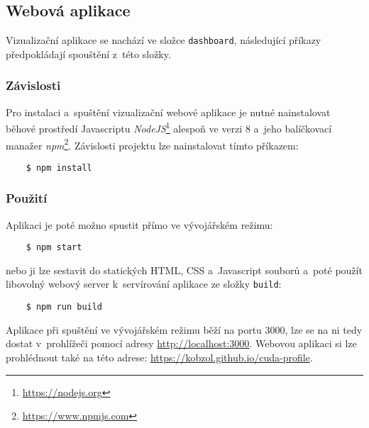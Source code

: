 \subsection{Webová aplikace}
Vizualizační aplikace se nachází ve složce \texttt{dashboard}, následující příkazy předpokládají spouštění z~této složky.

\subsubsection{Závislosti}
Pro instalaci a~spuštění vizualizační webové aplikace je nutné nainstalovat běhové prostředí Javascriptu \emph{NodeJS}\footnote{\url{https://nodejs.org}} alespoň ve verzi 8 a~jeho balíčkovací manažer \emph{npm}\footnote{\url{https://www.npmjs.com}}. Závislosti projektu lze nainstalovat tímto příkazem:
\begin{verbatim}
    $ npm install
\end{verbatim}

\subsubsection{Použití}
Aplikaci je poté možno spustit přímo ve vývojářském režimu:
\begin{verbatim}
    $ npm start
\end{verbatim}
nebo ji lze sestavit do statických HTML, CSS a~Javascript souborů a~poté použít libovolný webový server k~servírování aplikace ze složky \texttt{build}:
\begin{verbatim}
    $ npm run build
\end{verbatim}

Aplikace při spuštění ve vývojářském režimu běží na portu 3000, lze se na ni tedy dostat v~prohlížeči pomocí adresy \url{http://localhost:3000}.
Webovou aplikaci si lze prohlédnout také na této adrese: \url{https://kobzol.github.io/cuda-profile}.

